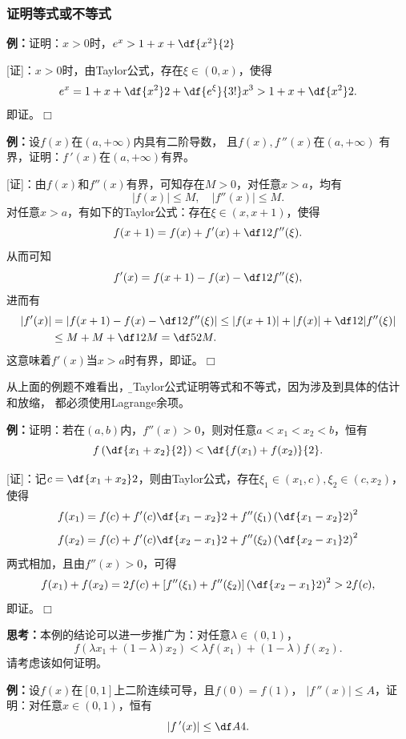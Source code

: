 \subsubsection{证明等式或不等式}

{\bf 例：}证明：$x>0$时，$e^x>1+x+\df{x^2}{2}$

[证]：$x>0$时，由Taylor公式，存在$\xi\in(0,x)$，使得
$$e^x=1+x+\df{x^2}2+\df{e^{\xi}}{3!}x^3>1+x+\df{x^2}2.$$
即证。\hfill$\Box$

{\bf 例：}设$f(x)$在$(a,+\infty)$内具有二阶导数，
且$f(x),f\,''(x)$在$(a,+\infty)$
有界，证明：$f\,'(x)$在$(a,+\infty)$有界。

[证]：由$f(x)$和$f''(x)$有界，可知存在$M>0$，对任意$x>a$，均有
$$|f(x)|\leq M,\quad |f''(x)|\leq M.$$
对任意$x>a$，有如下的Taylor公式：存在$\xi\in(x,x+1)$，使得
$$f(x+1)=f(x)+f'(x)+\df12f''(\xi).$$
从而可知
$$f'(x)=f(x+1)-f(x)-\df12f''(\xi),$$
进而有
\begin{align*}
	|f'(x)|&=|f(x+1)-f(x)-\df12f''(\xi)|
	\leq |f(x+1)|+|f(x)|+\df12|f''(\xi)|\\
	&\leq M+M+\df12M=\df52M.
\end{align*}
这意味着$f'(x)$当$x>a$时有界，即证。\hfill$\Box$

从上面的例题不难看出，{\b 用Taylor公式证明等式和不等式，因为涉及到具体的估计和放缩，
都必须使用Lagrange余项}。

{\bf 例：}证明：若在$(a,b)$内，$f''(x)>0$，则对任意$a<x_1<x_2<b$，恒有
$$f\left(\df{x_1+x_2}{2}\right)<\df{f(x_1)+f(x_2)}{2}.$$

[证]：记$c=\df{x_1+x_2}2$，则由Taylor公式，存在$\xi_1\in(x_1,c),
\xi_2\in(c,x_2)$，使得
$$f(x_1)=f(c)+f'(c)\df{x_1-x_2}2+f''(\xi_1)
\left(\df{x_1-x_2}2\right)^2$$
$$f(x_2)=f(c)+f'(c)\df{x_2-x_1}2+f''(\xi_2)
\left(\df{x_2-x_1}2\right)^2$$
两式相加，且由$f''(x)>0$，可得
$$f(x_1)+f(x_2)=2f(c)+[f''(\xi_1)+f''(\xi_2)]
\left(\df{x_2-x_1}2\right)^2>2f(c),$$
即证。\hfill$\Box$

{\bf 思考：}本例的结论可以进一步推广为：对任意$\lambda\in(0,1)$，
$$f(\lambda x_1+(1-\lambda)x_2)<\lambda
f(x_1)+(1-\lambda)f(x_2).$$
请考虑该如何证明。

% 

{\bf 例：}设$f(x)$在$[0,1]$上二阶连续可导，且$f(0)=f(1)$，
$|f\,''(x)|\leq A$，证明：对任意$x\in(0,1)$，恒有
$$|f\,'(x)|\leq\df A4.$$

